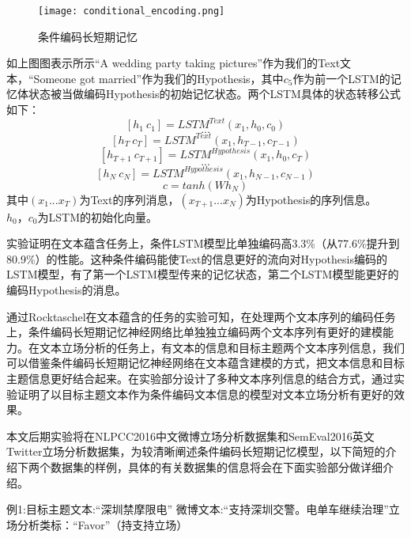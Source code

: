 \begin{figure}[htbp]
	\centering
	\texttt{[image: conditional\_encoding.png]}
	\caption[rnn_vanish]{条件编码长短期记忆}
\end{figure}

如上图图表示所示“A wedding party taking pictures”作为我们的Text文本，“Someone got married”作为我们的Hypothesis，其中$c_5$作为前一个LSTM的记忆体状态被当做编码Hypothesis的初始记忆状态。两个LSTM具体的状态转移公式如下：
\begin{equation}\label{lstm_f}[h_1~c_1] = LSTM^{Text}(x_1,h_0,c_0)\end{equation}
$$...$$
\begin{equation}\label{lstm_f}[h_T~c_T] = LSTM^{Text}(x_1,h_{T-1},c_{T-1})\end{equation}
\begin{equation}\label{lstm_f}[h_{T+1}~c_{T+1}] = LSTM^{Hypothesis}(x_1,h_0,c_T)\end{equation}
$$...$$
\begin{equation}\label{lstm_f}[h_{N}~c_{N}] = LSTM^{Hypothesis}(x_1,h_{N-1},c_{N-1})\end{equation}
\begin{equation}\label{lstm_f}c=tanh(Wh_N)\end{equation}
其中$(x_1...x_T)$为Text的序列消息，$(x_{T+1}...x_N)$为Hypothesis的序列信息。$h_0，c_0$为LSTM的初始化向量。

实验证明在文本蕴含任务上，条件LSTM模型比单独编码高3.3\%（从77.6\%提升到80.9\%）的性能。这种条件编码能使Text的信息更好的流向对Hypothesis编码的LSTM模型，有了第一个LSTM模型传来的记忆状态，第二个LSTM模型能更好的编码Hypothesis的消息。


通过Rocktaschel在文本蕴含的任务的实验可知，在处理两个文本序列的编码任务上，条件编码长短期记忆神经网络比单独独立编码两个文本序列有更好的建模能力。在文本立场分析的任务上，有文本的信息和目标主题两个文本序列信息，我们可以借鉴条件编码长短期记忆神经网络在文本蕴含建模的方式，把文本信息和目标主题信息更好结合起来。在实验部分设计了多种文本序列信息的结合方式，通过实验证明了以目标主题文本作为条件编码文本信息的模型对文本立场分析有更好的效果。

本文后期实验将在NLPCC2016中文微博立场分析数据集和SemEval2016英文Twitter立场分析数据集，为较清晰阐述条件编码长短期记忆模型，以下简短的介绍下两个数据集的样例，具体的有关数据集的信息将会在下面实验部分做详细介绍。

例1:目标主题文本:“深圳禁摩限电” 微博文本:“支持深圳交警。电单车继续治理”立场分析类标：“Favor”（持支持立场）

